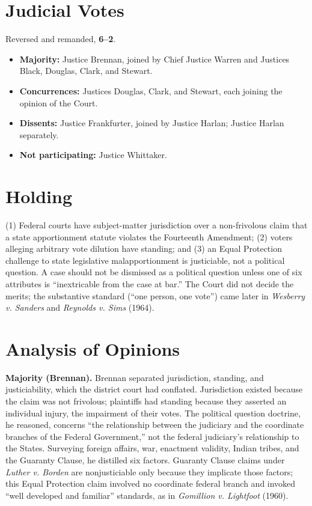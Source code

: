 \documentclass[12pt]{article}
\begin{document}
\section{Judicial Votes}

Reversed and remanded, \textbf{6--2}.
\begin{itemize}
\item \textbf{Majority:} Justice Brennan, joined by Chief Justice Warren and Justices Black, Douglas, Clark, and Stewart.
\item \textbf{Concurrences:} Justices Douglas, Clark, and Stewart, each joining the opinion of the Court.
\item \textbf{Dissents:} Justice Frankfurter, joined by Justice Harlan; Justice Harlan separately.
\item \textbf{Not participating:} Justice Whittaker.
\end{itemize}

\section{Holding}

(1) Federal courts have subject-matter jurisdiction over a non-frivolous claim that a state apportionment statute violates the Fourteenth Amendment; (2) voters alleging arbitrary vote dilution have standing; and (3) an Equal Protection challenge to state legislative malapportionment is justiciable, not a political question. A case should not be dismissed as a political question unless one of six attributes is ``inextricable from the case at bar.'' The Court did not decide the merits; the substantive standard (``one person, one vote'') came later in \textit{Wesberry v. Sanders} and \textit{Reynolds v. Sims} (1964).

\section{Analysis of Opinions}

\textbf{Majority (Brennan).} Brennan separated jurisdiction, standing, and justiciability, which the district court had conflated. Jurisdiction existed because the claim was not frivolous; plaintiffs had standing because they asserted an individual injury, the impairment of their votes. The political question doctrine, he reasoned, concerns ``the relationship between the judiciary and the coordinate branches of the Federal Government,'' not the federal judiciary's relationship to the States. Surveying foreign affairs, war, enactment validity, Indian tribes, and the Guaranty Clause, he distilled six factors. Guaranty Clause claims under \textit{Luther v. Borden} are nonjusticiable only because they implicate those factors; this Equal Protection claim involved no coordinate federal branch and invoked ``well developed and familiar'' standards, as in \textit{Gomillion v. Lightfoot} (1960).
\end{document}
